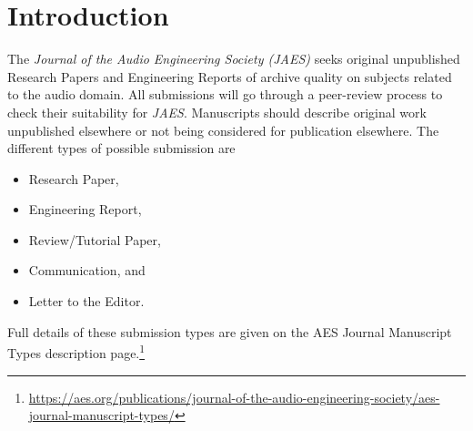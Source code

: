 \documentclass[fleqn]{jaes}
\begin{document}
\section{Introduction}
The \emph{Journal of the Audio Engineering Society (JAES)} seeks original unpublished Research Papers and Engineering Reports of archive quality on subjects related to the audio domain. All submissions will go through a peer-review process to check their suitability for \emph{JAES}. Manuscripts should describe original work unpublished elsewhere or not being considered for publication elsewhere. The different types of possible submission are
\begin{itemize}
    \item Research Paper,
    \item Engineering Report,
    \item Review/Tutorial Paper, 
    \item Communication, and
    \item Letter to the Editor.
\end{itemize}

Full details of these submission types are given on the AES Journal Manuscript Types description page.\footnote{\url{https://aes.org/publications/journal-of-the-audio-engineering-society/aes-journal-manuscript-types/}} 
\end{document}
